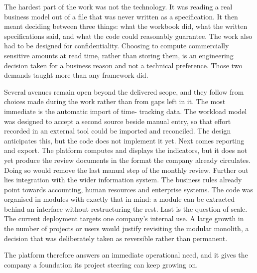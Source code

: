 The hardest part of the work was not the technology. It was reading a real business model out of a
file that was never written as a specification. It then meant deciding between three things: what
the workbook did, what the written specifications said, and what the code could reasonably
guarantee. The work also had to be designed for confidentiality. Choosing to compute commercially
sensitive amounts at read time, rather than storing them, is an engineering decision taken for a
business reason and not a technical preference. Those two demands taught more than any framework
did.

Several avenues remain open beyond the delivered scope, and they follow from choices made during
the work rather than from gaps left in it. The most immediate is the automatic import of time-
tracking data. The workload model was designed to accept a second source beside manual entry, so
that effort recorded in an external tool could be imported and reconciled. The design anticipates
this, but the code does not implement it yet. Next comes reporting and export. The platform
computes and displays the indicators, but it does not yet produce the review documents in the
format the company already circulates. Doing so would remove the last manual step of the monthly
review. Further out lies integration with the wider information system. The business rules already
point towards accounting, human resources and enterprise systems. The code was organised in
modules with exactly that in mind: a module can be extracted behind an interface without
restructuring the rest. Last is the question of scale. The current deployment targets one
company's internal use. A large growth in the number of projects or users would justify revisiting
the modular monolith, a decision that was deliberately taken as reversible rather than permanent.

The platform therefore answers an immediate operational need, and it gives the company a
foundation its project steering can keep growing on.
